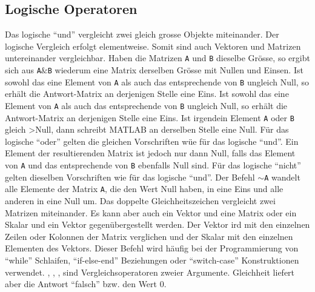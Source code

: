{\subsection{Logische Operatoren}
Das logische ``und'' \boxed{\textbf{\texttt{\&}}} vergleicht zwei gleich grosse Objekte miteinander. Der logische Vergleich erfolgt elementweise. Somit sind auch Vektoren und Matrizen untereinander vergleichbar.
\newline\newline
Haben die Matrizen \texttt{A} und \texttt{B} dieselbe Grösse, so ergibt sich aus \texttt{A$\&$B} wiederum eine Matrix derselben Grösse mit Nullen und Einsen. Ist sowohl das eine Element von \texttt{A} als auch das entsprechende von \texttt{B} ungleich Null, so erhält die Antwort-Matrix an derjenigen Stelle eine Eins.
\newline\newline
Ist sowohl das eine Element von \texttt{A} als auch das entsprechende von \texttt{B} ungleich Null, so erhält die Antwort-Matrix an derjenigen Stelle eine Eins. Ist irgendein Element \texttt{A} oder \texttt{B} gleich >Null, dann schreibt MATLAB an derselben Stelle eine Null.
\newline\newline
Für das logische ``oder'' \boxed{\textbf{\texttt{$\vert$}}} gelten die gleichen Vorschriften wüe für das logische ``und''. Ein Element der resultierenden Matrix ist jedoch nur dann Null, falls das Element von \texttt{A} und das entsprechende von \texttt{B} ebenfalls Null sind.
\newline\newline
Für das logische ``nicht'' \boxed{\textbf{\texttt{$\sim$}}} gelten dieselben Vorschriften wie für das logische ``und''. Der Befehl \texttt{$\sim$A} wandelt alle Elemente der Matrix \texttt{A}, die den Wert Null haben, in eine Eins und alle anderen in eine Null um.
\newline\newline
Das doppelte Gleichheitszeichen \boxed{\textbf{\texttt{==}}} vergleicht zwei Matrizen miteinander. Es kann aber auch ein Vektor und eine Matrix oder ein Skalar und ein Vektor gegenübergestellt werden. Der Vektor ird mit den einzelnen Zeilen oder Kolonnen der Matrix verglichen und der Skalar mit den einzelnen Elementen des Vektors. Dieser Befehl wird häufig bei der Programmierung von ``while'' Schlaifen, ``if-else-end'' Beziehungen oder ``switch-case'' Konstruktionen verwendet.
\newline\newline
\boxed{\textbf{\texttt{>}}}, \boxed{\textbf{\texttt{<}}}, \boxed{\textbf{\texttt{<=}}}, \boxed{\textbf{\texttt{>=}}} sind Vergleichsoperatoren zweier Argumente. Gleichheit liefert aber die Antwort ``falsch'' bzw. den Wert 0.
}
